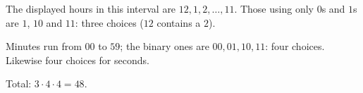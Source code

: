 The displayed hours in this interval are $12,1,2,\dots,11$. Those using only $0$s and $1$s are $1$, $10$ and $11$: three choices ($12$ contains a $2$).

Minutes run from $00$ to $59$; the binary ones are $00,01,10,11$: four choices. Likewise four choices for seconds.

Total: $3\cdot4\cdot4=\boxed{48}$.
